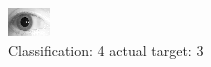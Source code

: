 \begin{figure}[h!]
\begin{center}
\includegraphics[width=0.60\columnwidth]{figures/ID1824_class_4_target_3.png}
\end{center}
\caption{ Classification: 4 actual target: 3}
\label{fig:ID1824_class_4_target_3}
\end{figure}
